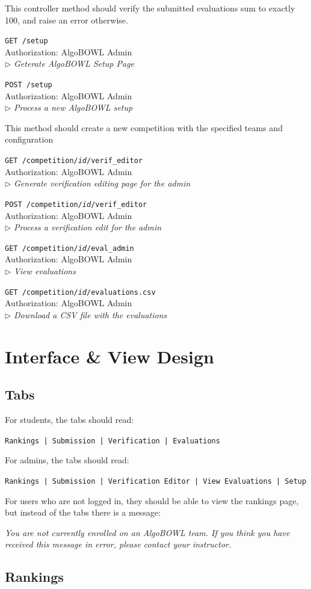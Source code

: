 \documentclass[12pt]{article}
\newcommand\ctrltitle[1]{\par\medskip\texttt{\large #1}\\}
\newcommand\ctrlauth[1]{Authorization: #1\\}
\newcommand\ctrldesc[1]{$\rhd$ \textsl{#1}\par\medskip}
\begin{document}
This controller method should verify the submitted evaluations sum to exactly
100, and raise an error otherwise.

\ctrltitle{GET /setup}
\ctrlauth{AlgoBOWL Admin}
\ctrldesc{Geterate AlgoBOWL Setup Page}

\ctrltitle{POST /setup}
\ctrlauth{AlgoBOWL Admin}
\ctrldesc{Process a new AlgoBOWL setup}

This method should create a new competition with the specified teams and
configuration

\ctrltitle{GET /competition/\emph{id}/verif\_editor}
\ctrlauth{AlgoBOWL Admin}
\ctrldesc{Generate verification editing page for the admin}

\ctrltitle{POST /competition/\emph{id}/verif\_editor}
\ctrlauth{AlgoBOWL Admin}
\ctrldesc{Process a verification edit for the admin}

\ctrltitle{GET /competition/\emph{id}/eval\_admin}
\ctrlauth{AlgoBOWL Admin}
\ctrldesc{View evaluations}

\ctrltitle{GET /competition/\emph{id}/evaluations.csv}
\ctrlauth{AlgoBOWL Admin}
\ctrldesc{Download a CSV file with the evaluations}

\section{Interface \& View Design}

\subsection{Tabs}

For students, the tabs should read:

\texttt{Rankings | Submission | Verification | Evaluations}

For admins, the tabs should read:

\texttt{Rankings | Submission | Verification Editor | View Evaluations | Setup}

For users who are not logged in, they should be able to view the rankings page,
but instead of the tabs there is a message:

\emph{You are not currently enrolled on an AlgoBOWL team. If you think you have
received this message in error, please contact your instructor.}

\subsection{Rankings}
\end{document}
